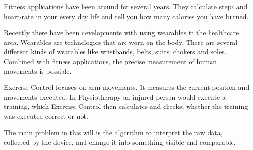 
Fitness applications have been around for several years. They calculate steps and heart-rate in your every day life and tell you how many calories you have burned.

Recently there have been developments with using wearables in the healthcare area. Wearables are technologies that are worn on the body. There are several different kinds of wearables like wristbands, belts, suits, chokers and soles. Combined with fitness applications, the precise measurement of human movements is possible.

Exercise Control focuses on arm movements. It measures the current position and movements executed. In Physiotherapy an injured person would execute a training, which Exercise Control then calculates and checks, whether the training was executed correct or not.

The main problem in this will is the algorithm to interpret the raw data, collected by the device, and change it into something visible and comparable.